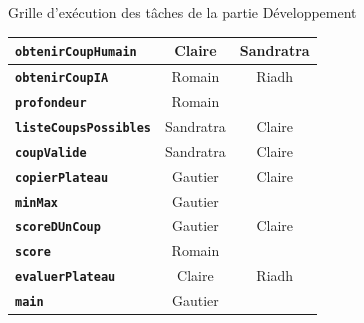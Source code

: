 \documentclass{beamer}
\begin{document}
\begin{frame}[label=dev]
\begin{alertblock}{Grille d’exécution des tâches de la partie \og Développement \fg }
{\begin{table}[h]
\begin{center}
\begin{tabular}{c|c|c|}
  \multicolumn{1}{|l|}{\textbf{\texttt{obtenirCoupHumain}}} & Claire & Sandratra\\ \hline
 \multicolumn{1}{|l|}{ \textbf{\texttt{obtenirCoupIA}}} & Romain & Riadh \\ \hline
  \multicolumn{1}{|l|}{\textbf{\texttt{profondeur}}} & Romain & \cellcolor{lightgray} \\ \hline
  \multicolumn{1}{|l|}{\textbf{\texttt{listeCoupsPossibles}}} & Sandratra & Claire \\ \hline
 \multicolumn{1}{|l|}{ \textbf{\texttt{coupValide}}} & Sandratra & Claire\\ \hline
  \multicolumn{1}{|l|}{\textbf{\texttt{copierPlateau}}} & Gautier & Claire \\ \hline
  \multicolumn{1}{|l|}{\textbf{\texttt{minMax}}} & Gautier & \cellcolor{lightgray} \\ \hline
  \multicolumn{1}{|l|}{\textbf{\texttt{scoreDUnCoup}}} & Gautier & Claire \\ \hline
  \multicolumn{1}{|l|}{\textbf{\texttt{score}}} & Romain &   \cellcolor{lightgray}  \\ \hline
 \multicolumn{1}{|l|}{ \textbf{\texttt{evaluerPlateau}}} & Claire &  Riadh \\ \hline
 \multicolumn{1}{|l|}{ \textbf{\texttt{main}}} & Gautier & \cellcolor{lightgray} \\ \hline
\end{tabular}
\end{center}
\end{table}
	}
	\end{alertblock}
	\end{frame}
\end{document}

